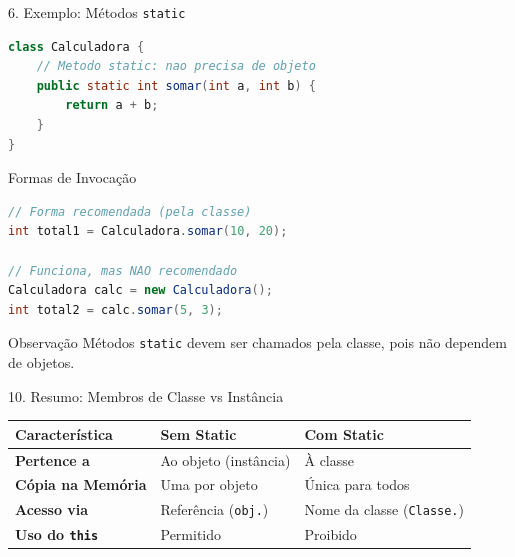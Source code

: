 \documentclass[9pt]{beamer}
\begin{document}
\begin{frame}[fragile]{6. Exemplo: Métodos \texttt{static}}

\begin{lstlisting}[language=Java]
class Calculadora {
    // Metodo static: nao precisa de objeto
    public static int somar(int a, int b) {
        return a + b;
    }
}
\end{lstlisting}

\vspace{0.3cm}

\begin{block}{Formas de Invocação}
\begin{lstlisting}[language=Java]
// Forma recomendada (pela classe)
int total1 = Calculadora.somar(10, 20);

// Funciona, mas NAO recomendado
Calculadora calc = new Calculadora();
int total2 = calc.somar(5, 3);
\end{lstlisting}
\end{block}

\vspace{0.3cm}

\begin{block}{Observação}
Métodos \texttt{static} devem ser chamados pela classe, 
pois não dependem de objetos.
\end{block}

\end{frame}
\begin{frame}{10. Resumo: Membros de Classe vs Instância}
    \centering
    \small
    \begin{tabular}{|l|l|l|}
        \hline
        \textbf{Característica} & \textbf{Sem Static} & \textbf{Com Static} \\ \hline
        \textbf{Pertence a} & Ao objeto (instância) & À classe \\ \hline
        \textbf{Cópia na Memória} & Uma por objeto & Única para todos \\ \hline
        \textbf{Acesso via} & Referência (\texttt{obj.}) & Nome da classe (\texttt{Classe.}) \\ \hline
        \textbf{Uso do \texttt{this}} & Permitido & Proibido \\ \hline
    \end{tabular}
\end{frame}
\end{document}
